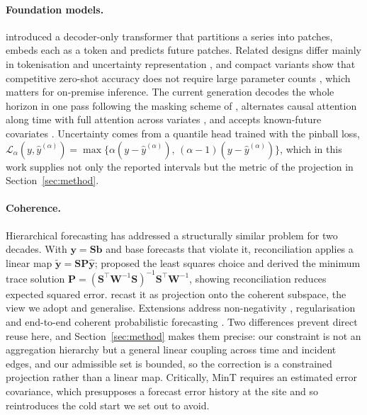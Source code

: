 \documentclass[11pt]{article}
\theoremstyle{plain}
\theoremstyle{definition}
\theoremstyle{remark}
\newcommand{\by}{\bm{y}}
\newcommand{\yhat}{\hat{\by}}
\newcommand{\ytil}{\tilde{\by}}
\begin{document}
\paragraph{Foundation models.}
\citet{das2024timesfm} introduced a decoder-only transformer that partitions a series into patches, embeds each as a token and predicts future patches. Related designs differ mainly in tokenisation and uncertainty representation \citep{ansari2024chronos,woo2024moirai,goswami2024moment}, and compact variants show that competitive zero-shot accuracy does not require large parameter counts \citep{ekambaram2024ttm}, which matters for on-premise inference. The current generation decodes the whole horizon in one pass following the masking scheme of \citet{auer2025tirex}, alternates causal attention along time with full attention across variates \citep{khwaja2026toto2,timesfm3}, and accepts known-future covariates \citep{timesfm3,ansari2025chronos2}. Uncertainty comes from a quantile head trained with the pinball loss, $\mathcal{L}_{\alpha}(y,\hat{y}^{(\alpha)}) = \max\{\alpha(y-\hat{y}^{(\alpha)}),\,(\alpha-1)(y-\hat{y}^{(\alpha)})\}$, which in this work supplies not only the reported intervals but the metric of the projection in Section~\ref{sec:method}.

\paragraph{Coherence.}
Hierarchical forecasting has addressed a structurally similar problem for two decades. With $\by = \bm{S}\bm{b}$ and base forecasts that violate it, reconciliation applies a linear map $\ytil = \bm{S}\bm{P}\yhat$; \citet{hyndman2011optimal} proposed the least squares choice and \citet{wickramasuriya2019mint} derived the minimum trace solution $\bm{P} = (\bm{S}^{\top}\bm{W}^{-1}\bm{S})^{-1}\bm{S}^{\top}\bm{W}^{-1}$, showing reconciliation reduces expected squared error. \citet{panagiotelis2021geometric} recast it as projection onto the coherent subspace, the view we adopt and generalise. Extensions address non-negativity \citep{wickramasuriya2020nonneg}, regularisation \citep{bentaieb2019regularized} and end-to-end coherent probabilistic forecasting \citep{rangapuram2021endtoend}. Two differences prevent direct reuse here, and Section~\ref{sec:method} makes them precise: our constraint is not an aggregation hierarchy but a general linear coupling across time and incident edges, and our admissible set is bounded, so the correction is a constrained projection rather than a linear map. Critically, MinT requires an estimated error covariance, which presupposes a forecast error history at the site and so reintroduces the cold start we set out to avoid.
\end{document}
